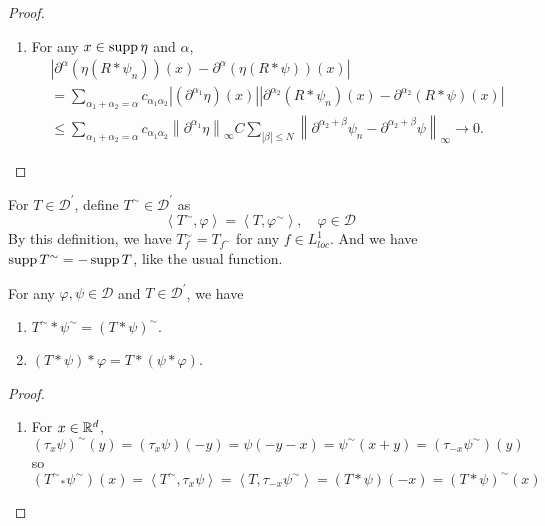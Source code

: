\begin{enumerate}[label=\arabic*.]
\begin{proof}
\begin{enumerate}[label=(\arabic{*})]
			\item For any $x \in \operatorname{supp} \eta$ and $\alpha$,
			\begin{equation*}
				\begin{aligned}
					& \left|\partial^\alpha\left(\eta\left(R * \psi_n\right)\right)(x)-\partial^\alpha(\eta(R * \psi))(x)\right| \\
					& =\sum_{\alpha_1+\alpha_2=\alpha} c_{\alpha_1 \alpha_2}\left|\left(\partial^{\alpha_1} \eta\right)(x)\right|\left|\partial^{\alpha_2}\left(R * \psi_n\right)(x)-\partial^{\alpha_2}(R * \psi)(x)\right| \\
					& \leq \sum_{\alpha_1+\alpha_2=\alpha} c_{\alpha_1 \alpha_2}\left\|\partial^{\alpha_1} \eta\right\|_{\infty} C \sum_{|\beta| \leq N}\left\|\partial^{\alpha_2+\beta} \psi_n-\partial^{\alpha_2+\beta} \psi\right\|_{\infty} \rightarrow 0 .
				\end{aligned}
			\end{equation*}
		\end{enumerate}
	\end{proof}

	For $T \in \mathcal{D}^\prime$, define $T^\sim \in \mathcal{D}^\prime$ as
	\begin{equation*}
		\left\langle T^{\sim}, \varphi\right\rangle=\left\langle T, \varphi^{\sim}\right\rangle, \quad \varphi \in \mathcal{D}
	\end{equation*}
	By this definition, we have $T_f^\sim = T_{f^\sim}$ for any $f \in L^1_{loc}$. And we have $\operatorname{supp} T^\sim = - \operatorname{supp} T$, like the usual function.

	\begin{prop}
		For any $\varphi,\psi \in \mathcal{D}$ and $T \in \mathcal{D}^\prime$, we have
		\begin{enumerate}
			\item $T^{\sim} * \psi^{\sim}=(T * \psi)^{\sim}$.
			\item $(T * \psi) * \varphi=T *(\psi * \varphi)$.
		\end{enumerate}
	\end{prop}
	\begin{proof}
		\begin{enumerate}
			\item For $x \in \mathbb{R}^d$,
			\begin{equation*}
				\left(\tau_x \psi\right)^{\sim}(y)=\left(\tau_x \psi\right)(-y)=\psi(-y-x)=\psi^{\sim}(x+y)=\left(\tau_{-x} \psi^{\sim}\right)(y)
			\end{equation*}
			so
			\begin{equation*}
				\left(T^{\sim}{ }_* \psi^{\sim}\right)(x)=\left\langle T^{\sim}, \tau_x \psi\right\rangle=\left\langle T, \tau_{-x} \psi^{\sim}\right\rangle=(T * \psi)(-x)=(T * \psi)^{\sim}(x)
			\end{equation*}


\end{enumerate}
\end{proof}
\end{enumerate}
